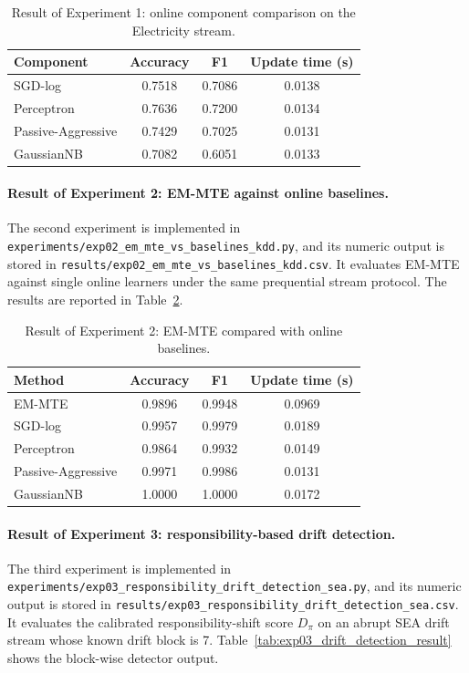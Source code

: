 ﻿\documentclass[12pt,a4paper]{article}
\begin{document}
\begin{table}[H]
\centering
\caption{Result of Experiment 1: online component comparison on the Electricity stream.}
\label{tab:exp01_online_components_result}
\renewcommand{\arraystretch}{1.25}
\begin{tabular}{lccc}
\toprule
\textbf{Component} & \textbf{Accuracy} & \textbf{F1} & \textbf{Update time (s)}\\
\midrule
SGD-log & 0.7518 & 0.7086 & 0.0138\\
Perceptron & 0.7636 & 0.7200 & 0.0134\\
Passive-Aggressive & 0.7429 & 0.7025 & 0.0131\\
GaussianNB & 0.7082 & 0.6051 & 0.0133\\
\bottomrule
\end{tabular}
\end{table}

\paragraph{Result of Experiment 2: EM-MTE against online baselines.}
The second experiment is implemented in
\texttt{experiments/exp02\_em\_mte\_vs\_baselines\_kdd.py}, and its numeric
output is stored in \texttt{results/exp02\_em\_mte\_vs\_baselines\_kdd.csv}.
It evaluates EM-MTE against single online learners under the same prequential
stream protocol. The results are reported in
Table~\ref{tab:exp02_em_mte_baseline_result}.

\begin{table}[H]
\centering
\caption{Result of Experiment 2: EM-MTE compared with online baselines.}
\label{tab:exp02_em_mte_baseline_result}
\renewcommand{\arraystretch}{1.25}
\begin{tabular}{lccc}
\toprule
\textbf{Method} & \textbf{Accuracy} & \textbf{F1} & \textbf{Update time (s)}\\
\midrule
EM-MTE & 0.9896 & 0.9948 & 0.0969\\
SGD-log & 0.9957 & 0.9979 & 0.0189\\
Perceptron & 0.9864 & 0.9932 & 0.0149\\
Passive-Aggressive & 0.9971 & 0.9986 & 0.0131\\
GaussianNB & 1.0000 & 1.0000 & 0.0172\\
\bottomrule
\end{tabular}
\end{table}

\paragraph{Result of Experiment 3: responsibility-based drift detection.}
The third experiment is implemented in
\texttt{experiments/exp03\_responsibility\_drift\_detection\_sea.py}, and its
numeric output is stored in
\texttt{results/exp03\_responsibility\_drift\_detection\_sea.csv}. It evaluates
the calibrated responsibility-shift score $D_\pi$ on an abrupt SEA drift
stream whose known drift block is 7. Table~\ref{tab:exp03_drift_detection_result}
shows the block-wise detector output.
\end{document}
